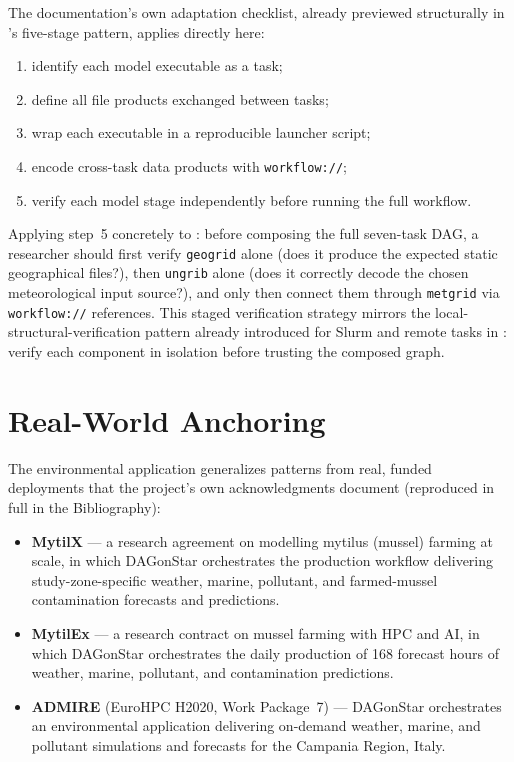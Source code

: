 The documentation's own adaptation checklist, already previewed structurally
in 's five-stage pattern, applies directly here:

\begin{enumerate}[leftmargin=1.6em]
  \item identify each model executable as a task;
  \item define all file products exchanged between tasks;
  \item wrap each executable in a reproducible launcher script;
  \item encode cross-task data products with \texttt{workflow://};
  \item verify each model stage independently before running the full
    workflow.
\end{enumerate}

\begin{example}
Applying step~5 concretely to : before composing the
full seven-task DAG, a researcher should first verify \texttt{geogrid} alone
(does it produce the expected static geographical files?), then
\texttt{ungrib} alone (does it correctly decode the chosen meteorological
input source?), and only then connect them through \texttt{metgrid} via
\texttt{workflow://} references. This staged verification strategy mirrors
the local-structural-verification pattern already introduced for Slurm and
remote tasks in : verify each component in isolation before
trusting the composed graph.
\end{example}

\section{Real-World Anchoring}

The environmental application generalizes patterns from real, funded
deployments that the project's own acknowledgments document
(reproduced in full in the Bibliography):

\begin{itemize}[leftmargin=1.4em]
  \item \textbf{MytilX} --- a research agreement on modelling mytilus
    (mussel) farming at scale, in which DAGonStar orchestrates the
    production workflow delivering study-zone-specific weather, marine,
    pollutant, and farmed-mussel contamination forecasts and predictions.
  \item \textbf{MytilEx} --- a research contract on mussel farming with HPC
    and AI, in which DAGonStar orchestrates the daily production of 168
    forecast hours of weather, marine, pollutant, and contamination
    predictions.
  \item \textbf{ADMIRE} (EuroHPC H2020, Work Package~7) --- DAGonStar
    orchestrates an environmental application delivering on-demand weather,
    marine, and pollutant simulations and forecasts for the Campania Region,
    Italy.
\end{itemize}

